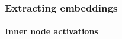 \documentclass[10pt, t, xcolor={usenames,dvipsnames,svgnames}, compress]{beamer}
\begin{document}
\begin{frame}
  \frametitle{Extracting embeddings}
  \framesubtitle{Inner node activations}
  \begin{minipage}{0.4\linewidth}
    \begin{center}

\end{center}
\end{minipage}
\end{frame}
\end{document}
